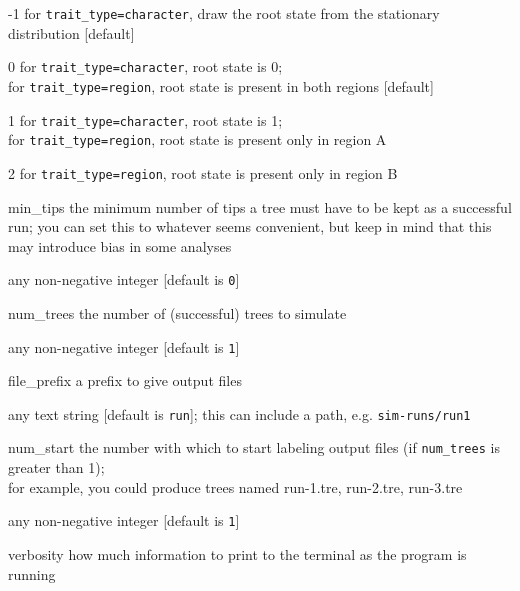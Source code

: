 \documentclass[10pt]{article}
\begin{document}
\begin{optdescrip}
\begin{valdescrip}
			\item[-1] for \texttt{trait\_type=character}, draw the root state from the stationary distribution [default]
			\item[0] for \texttt{trait\_type=character}, root state is 0; \\
				for \texttt{trait\_type=region}, root state is present in both regions [default]
			\item[1] for \texttt{trait\_type=character}, root state is 1; \\
				for \texttt{trait\_type=region}, root state is present only in region A
			\item[2] for \texttt{trait\_type=region}, root state is present only in region B
		\end{valdescrip}
	\item[min\_tips] the minimum number of tips a tree must have to be kept as a successful run; you can set this to whatever seems convenient, but keep in mind that this may introduce bias in some analyses
		\begin{valdescrip}
			\item[] any non-negative integer [default is \texttt{0}]
		\end{valdescrip}
	\item[num\_trees] the number of (successful) trees to simulate
		\begin{valdescrip}
			\item[] any non-negative integer [default is \texttt{1}]
		\end{valdescrip}
	\item[file\_prefix] a prefix to give output files
		\begin{valdescrip}
			\item[] any text string [default is \texttt{run}];
				this can include a path, e.g. \texttt{sim-runs/run1}
		\end{valdescrip}
	\item[num\_start] the number with which to start labeling output files (if \texttt{num\_trees} is greater than 1); \\ for example, you could produce trees named run-1.tre, run-2.tre, run-3.tre
		\begin{valdescrip}
			\item[] any non-negative integer [default is \texttt{1}]
		\end{valdescrip}
	\item[verbosity] how much information to print to the terminal as the program is running
		\begin{valdescrip}

\end{valdescrip}
\end{optdescrip}
\end{document}
